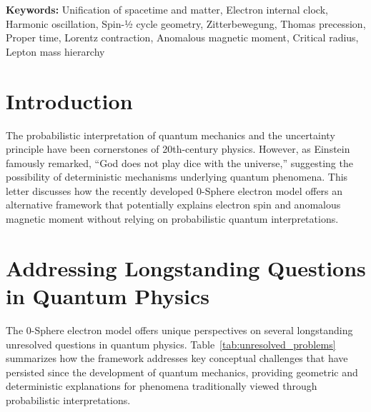 \documentclass[12pt,letterpaper]{article} %
\begin{document}
\vspace{1.5cm}

\noindent\textbf{Keywords:} Unification of spacetime and matter, Electron internal clock, Harmonic oscillation, Spin-½ cycle geometry, Zitterbewegung, Thomas precession, Proper time, Lorentz contraction, Anomalous magnetic moment, Critical radius, Lepton mass hierarchy

\section{Introduction}

The probabilistic interpretation of quantum mechanics and the uncertainty principle have been cornerstones of 20th-century physics. However, as Einstein famously remarked, ``God does not play dice with the universe,'' suggesting the possibility of deterministic mechanisms underlying quantum phenomena\cite{einstein1935}. This letter discusses how the recently developed 0-Sphere electron model offers an alternative framework that potentially explains electron spin and anomalous magnetic moment without relying on probabilistic quantum interpretations\cite{hanamura2023}.


\section{Addressing Longstanding Questions in Quantum Physics}

The 0-Sphere electron model offers unique perspectives on several longstanding unresolved questions in quantum physics. Table~\ref{tab:unresolved_problems} summarizes how the framework addresses key conceptual challenges that have persisted since the development of quantum mechanics, providing geometric and deterministic explanations for phenomena traditionally viewed through probabilistic interpretations.
\end{document}

